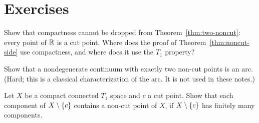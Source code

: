 \section*{Exercises}

\begin{exercise}
Show that compactness cannot be dropped from Theorem~\ref{thm:two-noncut}: every point of $\mathbb{R}$ is
a cut point. Where does the proof of Theorem~\ref{thm:noncut-side} use compactness, and where
does it use the $T_1$ property?
\end{exercise}

\begin{exercise}
Show that a nondegenerate continuum with exactly two non-cut points is an arc. (Hard; this is a
classical characterization of the arc. It is not used in these notes.)
\end{exercise}

\begin{exercise}
Let $X$ be a compact connected $T_1$ space and $c$ a cut point. Show that each component of
$X\setminus\left\{ c \right\}$ contains a non-cut point of $X$, if $X\setminus\left\{ c \right\}$ has finitely many components.
\end{exercise}
